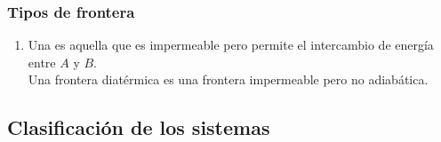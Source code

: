 \documentclass[12pt]{beamer}
\begin{document}
\begin{frame}
\frametitle{Tipos de frontera}
\begin{enumerate}[<+->]
\conti
\item Una  es aquella que es impermeable pero permite el intercambio de energía entre $A$ y $B$.
\\[0.5em] \pause
Una frontera diatérmica es una frontera impermeable pero no adiabática.
\end{enumerate}
\end{frame}

\subsection{Clasificación de los sistemas}
\end{document}
